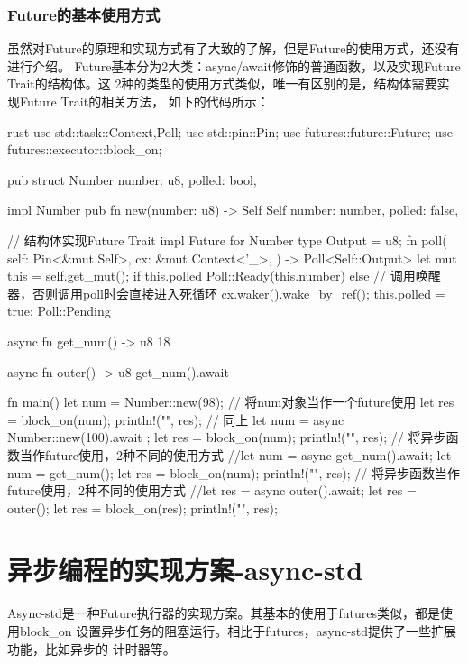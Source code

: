 \subsubsection{Future的基本使用方式}
虽然对Future的原理和实现方式有了大致的了解，但是Future的使用方式，还没有进行介绍。
Future基本分为2大类：async/await修饰的普通函数，以及实现Future Trait的结构体。这
2种的类型的使用方式类似，唯一有区别的是，结构体需要实现Future Trait的相关方法，
如下的代码所示：
\begin{code-block}{rust}
use std::task::{Context,Poll};
use std::pin::Pin;
use futures::future::Future;
use futures::executor::block_on;

pub struct Number {
    number: u8,
    polled: bool,
}

impl Number {
    pub fn new(number: u8) -> Self {
       Self {
            number: number,
            polled: false,
       }
    }
}

// 结构体实现Future Trait
impl Future for Number {
    type Output = u8;
    fn poll(
       self: Pin<&mut Self>,
       cx: &mut Context<'_>,
    ) -> Poll<Self::Output> {
        let mut this = self.get_mut();
        if this.polled {
            Poll::Ready(this.number)
        } else {
            // 调用唤醒器，否则调用poll时会直接进入死循环
            cx.waker().wake_by_ref();
            this.polled = true;
            Poll::Pending
        }
    }
}

async fn get_num() -> u8 {
    18
}

async fn outer() -> u8 {
    get_num().await
}

fn main(){
    let num = Number::new(98);
    // 将num对象当作一个future使用
    let res = block_on(num);
    println!("{}", res);
    // 同上
    let num = async { Number::new(100).await };
    let res = block_on(num);
    println!("{}", res);
    // 将异步函数当作future使用，2种不同的使用方式
    //let num = async {get_num().await};
    let num = get_num();
    let res = block_on(num);
    println!("{}", res);
    // 将异步函数当作future使用，2种不同的使用方式
    //let res = async {outer().await};
    let res = outer();
    let res = block_on(res);
    println!("{}", res);
}
\end{code-block}

\section{异步编程的实现方案-async-std}
Async-std是一种Future执行器的实现方案。其基本的使用于futures类似，都是使用block\_on
设置异步任务的阻塞运行。相比于futures，async-std提供了一些扩展功能，比如异步的
计时器等。

